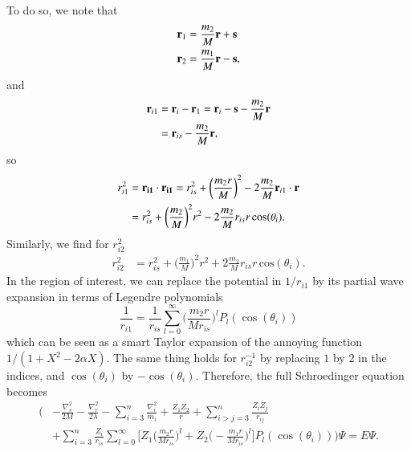 \documentclass[aip,jcp,reprint,noshowkeys,superscriptaddress]{revtex4-1}
\newcommand{\bd}[1]{{\bf {#1}}}
\newcommand{\br}[0]{{\bf {r}}}
\newcommand{\bs}[0]{{\bf {s}}}
\begin{document}
To do so, we note that
\begin{equation}
 \begin{aligned}
 & \bd{r}_1 = \frac{m_2}{M}\br + \bs\\
 & \bd{r}_2 = \frac{m_1}{M}\br - \bs,
 \end{aligned}
\end{equation}
and 
\begin{equation}
 \begin{aligned}
 \bd{r}_{i1}& = \bd{r}_i - \bd{r}_1 = \bd{r}_i - \bd{s} - \frac{m_2}{M}\bd{r}\\
            & = \bd{r}_{is} - \frac{m_2}{M}\bd{r},
 \end{aligned}
\end{equation}
so 
\begin{equation}
 \begin{aligned}
 r_{i1}^2 &  = \bd{r_{i1}} \cdot \bd{r_{i1}} = r_{is}^2 + \bigg(\frac{m_2 r}{M}\bigg)^2 - 2\frac{m_2}{M} \bd{r}_{i1} \cdot \bd{r} \\
            & = r_{is}^2 + \bigg(\frac{m_2}{M}\bigg)^2 r^2 - 2\frac{m_2}{M} r_{is} r\, \text{cos}(\theta_i).
 \end{aligned}
\end{equation}
Similarly, we find for $r_{i2}^2$
\begin{equation}
 \begin{aligned}
 r_{i2}^2 &  = r_{is}^2 + \bigg(\frac{m_1}{M}\bigg)^2 r^2 + 2\frac{m_2}{M} r_{is} r\, \text{cos}(\theta_i).
 \end{aligned}
\end{equation}
In the region of interest, we can replace the potential in $1/r_{i1}$ by its partial wave expansion in terms of Legendre polynomials 
\begin{equation}
  \frac{1}{r_{i1}} = \frac{1}{r_{is}} \sum_{l=0}^\infty \bigg( \frac{m_2 r}{Mr_{is}} \bigg)^l P_l(\cos(\theta_i))
\end{equation}
which can be seen as a smart Taylor expansion of the annoying function $1/(1+X^2 -2 \alpha X)$. 
The same thing holds for $r_{i2}^{-1}$ by replacing $1$ by $2$ in the indices, and $\cos(\theta_i)$ by $-\cos(\theta_i)$. 
Therefore, the full Schroedinger equation becomes
\begin{equation}
 \begin{aligned}
  \bigg(&  -\frac{\nabla_{s}^2}{2 M}- \frac{\nabla_r^2}{2\lambda} - \sum_{i=3}^n \frac{\nabla_i^2}{m_i} + \frac{Z_1 Z_2}{r} 
   + \sum_{i>j=3}^n \frac{Z_i Z_j}{r_{ij}} \\
  &+ \sum_{i=3}^n \frac{Z_i}{r_{is}} \sum_{l=0}^\infty \bigg[Z_1 \bigg( \frac{m_2 r}{Mr_{is}}  \bigg)^l 
                                                            +Z_2 \bigg( -\frac{m_1 r}{Mr_{is}} \bigg)^l\bigg]P_l(\cos(\theta_i)) \bigg) \Psi = E \Psi.
 \end{aligned}
\end{equation}
\end{document}
